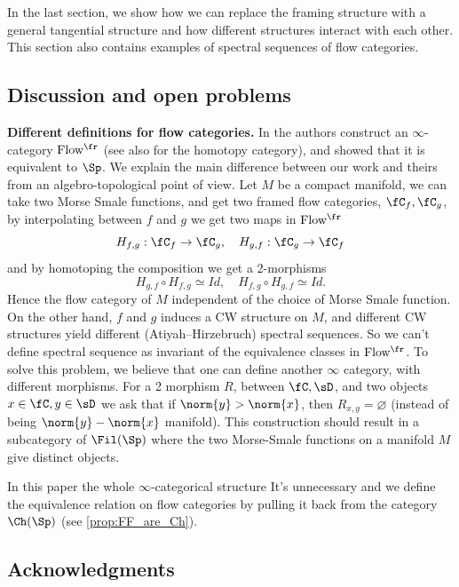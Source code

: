 In the last section, we show how we can replace the framing structure with a general tangential structure and how different structures interact with each other. This section also contains examples of spectral sequences of flow categories.

\subsection*{Discussion and open problems}
\textbf{Different definitions for flow categories.} In \cite{abouzaid2024foundation} the authors construct an $\infty$-category $\mathrm{Flow^{\fr}}$ (see also \cite{porcelli2024bordism} for the homotopy category), and showed that it is equivalent to $\Sp$. We explain the main difference between our work and theirs from an algebro-topological point of view. Let $M$ be a compact manifold, we can take two Morse Smale functions, and get two framed flow categories, $\fC_f,\fC_g$, by interpolating between $f$ and $g$ we get two maps in $\mathrm{Flow^{\fr}}$
\begin{equation*}
    H_{f,g}: \fC_f \to \fC_g, \quad H_{g,f}: \fC_g \to \fC_f
\end{equation*}
and by homotoping the composition we get a 2-morphisms
\begin{equation*}
    H_{g,f} \circ H_{f,g} \simeq Id, \quad H_{f,g} \circ H_{g,f} \simeq Id.
\end{equation*}
Hence the flow category of $M$ independent of the choice of Morse Smale function.
On the other hand, $f$ and $g$ induces a CW structure on $M$, and different CW structures yield different (Atiyah–Hirzebruch) spectral sequences. So we can't define spectral sequence as invariant of the equivalence classes in $\mathrm{Flow^{\fr}}$.
To solve this problem, we believe that one can define another $\infty$ category, with different morphisms. For a 2 morphism $R$, between $\fC,\sD$, and two objects $x \in \fC, y \in \sD$ we ask that if $\norm{y} > \norm{x}$, then $R_{x,y} = \varnothing$ (instead of being $\norm{y}-\norm{x}$ manifold). This construction should result in a subcategory of $\Fil(\Sp)$ where the two Morse-Smale functions on a manifold $M$ give distinct objects.

In this paper the whole $\infty$-categorical structure It’s unnecessary and we define the equivalence relation on flow categories by pulling it back from the category $\Ch(\Sp)$ (see \cref{prop:FF_are_Ch}).
\subsection*{Acknowledgments}
